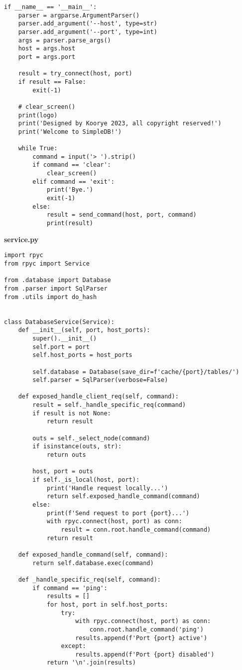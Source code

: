 \begin{appendix}
\begin{lstlisting}
if __name__ == '__main__':
    parser = argparse.ArgumentParser()
    parser.add_argument('--host', type=str)
    parser.add_argument('--port', type=int)
    args = parser.parse_args()
    host = args.host
    port = args.port

    result = try_connect(host, port)
    if result == False:
        exit(-1)

    # clear_screen()
    print(logo)
    print('Designed by Koorye 2023, all copyright reserved!')
    print('Welcome to SimpleDB!')

    while True:
        command = input('> ').strip()
        if command == 'clear':
            clear_screen()
        elif command == 'exit':
            print('Bye.')
            exit(-1)
        else:
            result = send_command(host, port, command)
            print(result)
\end{lstlisting}

\textbf{service.py}

\begin{lstlisting}
import rpyc
from rpyc import Service    

from .database import Database
from .parser import SqlParser
from .utils import do_hash


class DatabaseService(Service):
    def __init__(self, port, host_ports):
        super().__init__()
        self.port = port
        self.host_ports = host_ports

        self.database = Database(save_dir=f'cache/{port}/tables/')
        self.parser = SqlParser(verbose=False)
    
    def exposed_handle_client_req(self, command):
        result = self._handle_specific_req(command)
        if result is not None:
            return result
       
        outs = self._select_node(command)
        if isinstance(outs, str):
            return outs

        host, port = outs
        if self._is_local(host, port):
            print('Handle request locally...')
            return self.exposed_handle_command(command)
        else:
            print(f'Send request to port {port}...')
            with rpyc.connect(host, port) as conn:
                result = conn.root.handle_command(command)
            return result
    
    def exposed_handle_command(self, command):
        return self.database.exec(command)
    
    def _handle_specific_req(self, command):
        if command == 'ping':
            results = []
            for host, port in self.host_ports:
                try:
                    with rpyc.connect(host, port) as conn:
                        conn.root.handle_command('ping')
                    results.append(f'Port {port} active')
                except:
                    results.append(f'Port {port} disabled')
            return '\n'.join(results)
        

\end{lstlisting}
\end{appendix}
